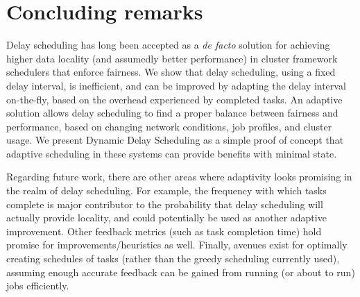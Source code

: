 \section{Concluding remarks}\label{sec:conclusion}

Delay scheduling has long been accepted as a \textit{de facto} solution for achieving
higher data locality (and assumedly better performance) in cluster framework schedulers that
enforce fairness. We show that 
delay scheduling, using a fixed delay interval, is inefficient, and can be improved by 
adapting the delay interval on-the-fly, based on the overhead experienced by completed tasks. 
An adaptive solution allows delay scheduling to find a proper balance between fairness and
performance, based on changing network conditions, job profiles, and cluster usage.
We present Dynamic Delay Scheduling as a simple proof of concept that adaptive scheduling
in these systems can provide benefits with minimal state.

Regarding future work, there are other areas where adaptivity looks promising in the realm of
delay scheduling. For example, the frequency with which tasks complete is major contributor
to the probability that delay scheduling will actually provide locality, and could potentially
be used as another adaptive improvement. Other feedback metrics (such as task completion time) 
hold promise for improvements/heuristics as well. Finally, avenues exist for optimally creating 
schedules of tasks (rather than the greedy scheduling currently used), assuming enough accurate
feedback can be gained from running (or about to run) jobs efficiently.
